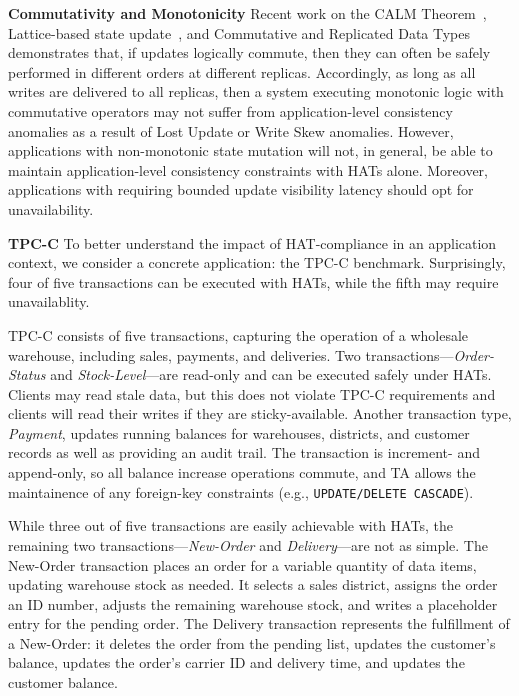 \vspace{.5em}\noindent\textbf{Commutativity and Monotonicity} Recent
work on the CALM Theorem~\cite{calm}, Lattice-based state
update~\cite{blooml}, and Commutative and Replicated Data
Types~\cite{crdt} demonstrates that, if updates logically commute,
then they can often be safely performed in different orders at
different replicas. Accordingly, as long as all writes are delivered
to all replicas, then a system executing monotonic logic with
commutative operators may not suffer from application-level
consistency anomalies as a result of Lost Update or Write Skew
anomalies. However, applications with non-monotonic state mutation
will not, in general, be able to maintain application-level
consistency constraints with HATs alone. Moreover, applications with
requiring bounded update visibility latency should opt for
unavailability.

\vspace{.5em}\noindent\textbf{TPC-C} To better understand the impact
of HAT-compliance in an application context, we consider a concrete
application: the TPC-C benchmark. Surprisingly, four of five
transactions can be executed with HATs, while the fifth may require
unavailablity.

TPC-C consists of five transactions, capturing the operation of a
wholesale warehouse, including sales, payments, and deliveries. Two
transactions---\textit{Order-Status} and \textit{Stock-Level}---are
read-only and can be executed safely under HATs. Clients may read
stale data, but this does not violate TPC-C requirements and clients
will read their writes if they are sticky-available. Another
transaction type, \textit{Payment}, updates running balances for
warehouses, districts, and customer records as well as providing an
audit trail. The transaction is increment- and append-only, so all
balance increase operations commute, and TA allows the
maintainence of any foreign-key constraints (e.g.,
\texttt{UPDATE/DELETE CASCADE}).

While three out of five transactions are easily achievable with
HATs, the remaining two transactions---\textit{New-Order} and
\textit{Delivery}---are not as simple. The New-Order transaction
places an order for a variable quantity of data items, updating
warehouse stock as needed. It selects a sales district, assigns the
order an ID number, adjusts the remaining warehouse stock, and writes
a placeholder entry for the pending order. The Delivery transaction
represents the fulfillment of a New-Order: it deletes the order from
the pending list, updates the customer's balance, updates the order's
carrier ID and delivery time, and updates the customer balance.


